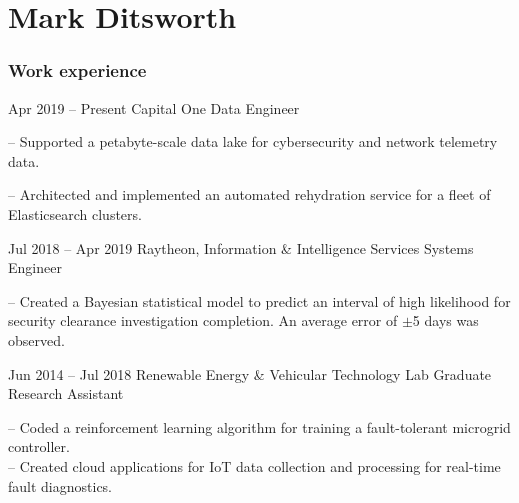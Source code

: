\documentclass{tccv}
\begin{document}
\part{Mark Ditsworth}

\section{Work experience}

\begin{eventlist}

\item{Apr 2019 -- Present}
    {Capital One}
    {Data Engineer}
    
-- Supported a petabyte-scale data lake for cybersecurity and network telemetry data.

-- Architected and implemented an automated rehydration service for a fleet of Elasticsearch clusters.

\item{Jul 2018 -- Apr 2019}
    {Raytheon, Information \& Intelligence Services}
    {Systems Engineer}
    
-- Created a Bayesian statistical model to predict an interval of high
likelihood for security clearance investigation completion. An average
error of $\pm$5 days was observed.

\item{Jun 2014 -- Jul 2018}
     {Renewable Energy \& Vehicular Technology Lab}
     {Graduate Research Assistant}

-- Coded a reinforcement learning algorithm for training a fault-tolerant
microgrid controller.\\
-- Created cloud applications for IoT data collection
and processing for real-time fault diagnostics.\\

%

\end{eventlist}
\vspace{-12pt}
\end{document}
